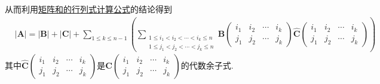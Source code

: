 \documentclass[../../main.tex]{subfiles}
\begin{document}
\begin{solution}
\begin{enumerate}[(1)]
从而利用\hyperref[proposition:矩阵和的行列式计算公式]{矩阵和的行列式计算公式}的结论得到
\begin{align}\label{eq(行列式):1.5式}
&|\boldsymbol{A}| = |\boldsymbol{B}| + |\boldsymbol{C}| + \sum_{1\leqslant k\leqslant n - 1}\left(\sum_{\begin{array}{c}
1\leqslant i_1 < i_2 < \cdots < i_k\leqslant n\\
1\leqslant j_1 < j_2 < \cdots < j_k\leqslant n
\end{array}}\boldsymbol{B}\left(\begin{matrix}
i_1 & i_2 & \cdots & i_k\\
j_1 & j_2 & \cdots & j_k
\end{matrix}\right)\widehat{\boldsymbol{C}}\left(\begin{matrix}
i_1 & i_2 & \cdots & i_k\\
j_1 & j_2 & \cdots & j_k
\end{matrix}\right)\right)
\end{align}
其中\(\widehat{\boldsymbol{C}}\left(\begin{matrix}
i_1 & i_2 & \cdots & i_k\\
j_1 & j_2 & \cdots & j_k
\end{matrix}\right)\)是\(\boldsymbol{C}\left(\begin{matrix}
i_1 & i_2 & \cdots & i_k\\
j_1 & j_2 & \cdots & j_k
\end{matrix}\right)\)的代数余子式.


\end{enumerate}
\end{solution}
\end{document}
